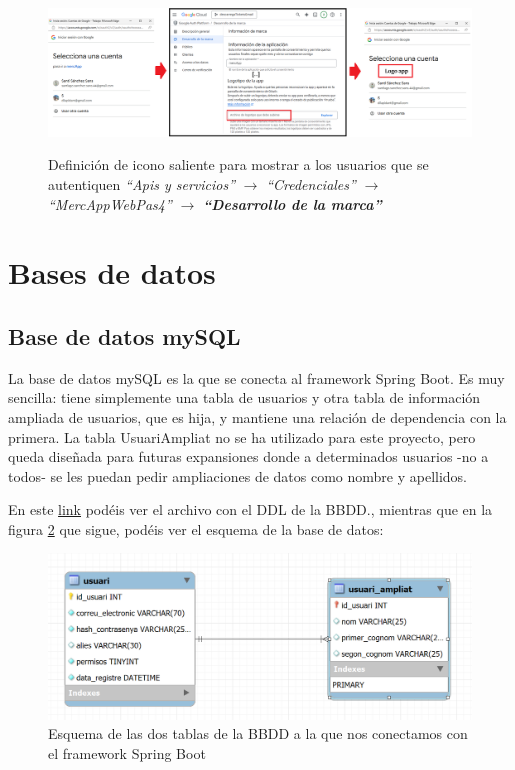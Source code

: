 \documentclass[a4paper,12pt]{report}
\begin{document}
	\FloatBarrier
	\setlength{\belowcaptionskip}{3pt}
	\begin{figure}[H]
		\centering
		\caption{Definición de icono saliente para mostrar a los usuarios que se autentiquen \textit{``Apis y servicios''} $\rightarrow$ \textit{``Credenciales''} $\rightarrow$ \textit{``MercAppWebPas4''} $\rightarrow$ \textbf{\textit{``Desarrollo de la marca''}}}
		\includegraphics[width=1\linewidth]{img/mercAppLogo}
		\label{fig:mercAppLogo}
	\end{figure}
	\FloatBarrier
	
	
	
	\section{Bases de datos}
	
	\subsection{Base de datos mySQL}
	
	La base de datos mySQL es la que se conecta al framework Spring Boot. Es muy sencilla: tiene simplemente una tabla de usuarios y otra tabla de información ampliada de usuarios, que es hija, y mantiene una relación de dependencia con la primera. La tabla UsuariAmpliat no se ha utilizado para este proyecto, pero queda diseñada para futuras expansiones donde a determinados usuarios -no a todos- se les puedan pedir ampliaciones de datos como nombre y apellidos.
	
	En este \href{https://github.com/blackcub3s/mercApp/blob/main/APP%20WEB/___BBDD___/estructuraTaules/mercApp.sql}{link} podéis ver el archivo con el DDL de la BBDD., mientras que en la figura \ref{fig:esquemaworkbench} que sigue, podéis ver el esquema de la base de datos: 
	\FloatBarrier
	\begin{figure}[H]
		\centering
		\includegraphics[width=1\linewidth]{img/esquemaWorkbench}
		\caption{Esquema de las dos tablas de la BBDD a la que nos conectamos con el framework Spring Boot}
		\label{fig:esquemaworkbench}
	\end{figure}
	\FloatBarrier
	
\end{document}
